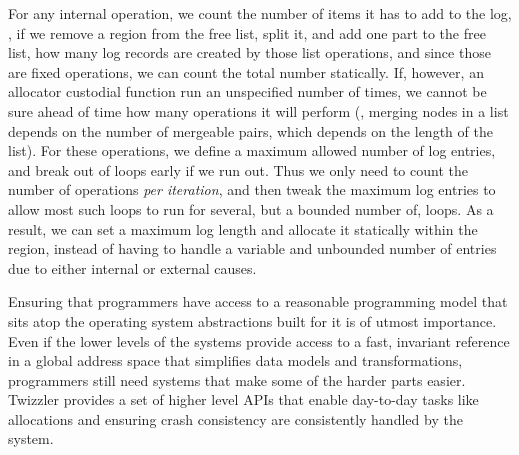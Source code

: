 For any internal operation, we count the number of items it has to add to the log, \eg, if we remove a region from the
free list, split it, and add one part to the free list, how many log records are created by those list operations, and
since those are fixed operations, we can count the total number statically. If, however, an allocator custodial function
run an unspecified number of times, we cannot be sure ahead of time how many operations it will perform (\eg, merging
nodes in a list depends on the number of mergeable pairs, which depends on the length of the list). For these
operations, we define a maximum allowed number of log entries, and break out of loops early if we run out. Thus we only
need to count the number of operations \emph{per iteration}, and then tweak the maximum log entries to allow most such
loops to run for several, but a bounded number of, loops. As a result, we can set a maximum log length and allocate it
statically within the region, instead of having to handle a variable and unbounded number of entries due to either
internal or external causes.

\begin{chconc}
    Ensuring that programmers have access to a reasonable programming model that sits atop the operating system
    abstractions built for it is of utmost importance. Even if the lower levels of the systems provide access to a fast,
    invariant reference in a global address space that simplifies data models and transformations, programmers still
    need systems that make some of the harder parts easier. Twizzler provides a set of higher level APIs that enable
    day-to-day tasks like allocations and ensuring crash consistency are consistently handled by the system.
\end{chconc}